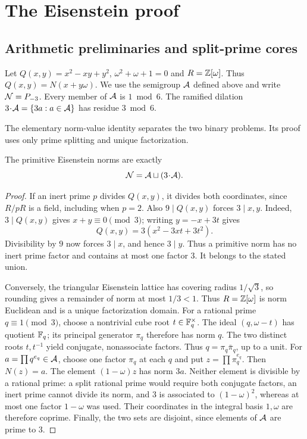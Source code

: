 \section{The Eisenstein proof}\label{sec:eisenstein}
\subsection{Arithmetic preliminaries and split-prime cores}
Let $Q(x,y)=x^2-xy+y^2$, $\omega^2+\omega+1=0$ and
$R=\Z[\omega]$.  Thus $Q(x,y)=N(x+y\omega)$.  We use the
semigroup $\AA$ defined above and write $\NN=P_{-3}$.
Every member of $\AA$ is $1\bmod6$.  The ramified dilation
$3\!\cdot\!\AA=\{3a:a\in\AA\}$ has residue $3\bmod6$.

The elementary norm-value identity separates the two binary problems.
Its proof uses only prime splitting and unique factorization.

\begin{proposition}\label{prop:primitive-classification}
The primitive Eisenstein norms are exactly
\[
\NN=\AA\sqcup(3\!\cdot\!\AA).
\]
\end{proposition}
\begin{proof}
If an inert prime $p$ divides $Q(x,y)$, it divides both coordinates,
since $R/pR$ is a field, including when $p=2$. Also $9\mid Q(x,y)$ forces $3\mid x,y$.
Indeed, $3\mid Q(x,y)$ gives $x+y\equiv0\pmod3$; writing
$y=-x+3t$ gives
\[
Q(x,y)=3(x^2-3xt+3t^2).
\]
Divisibility by $9$ now forces $3\mid x$, and hence $3\mid y$.
Thus a primitive norm has no inert prime factor and contains at most
one factor $3$. It belongs to the stated union.

Conversely, the triangular Eisenstein lattice has covering radius
$1/\sqrt3$, so rounding gives a remainder of norm at most $1/3<1$.
Thus $R=\Z[\omega]$ is norm Euclidean and is a unique factorization
domain. For a rational
prime $q\equiv1\pmod3$, choose a nontrivial cube root
$t\in\F_q^\times$. The ideal $(q,\omega-t)$ has quotient $\F_q$;
its principal generator $\pi_q$ therefore has norm $q$. The two distinct
roots $t,t^{-1}$ yield conjugate, nonassociate factors. Thus
$q=\pi_q\bar\pi_q$, up to a unit.
For $a=\prod q^{e_q}\in\AA$, choose one factor $\pi_q$ at each $q$ and
put $z=\prod\pi_q^{e_q}$. Then $N(z)=a$. The element
$(1-\omega)z$ has norm $3a$. Neither element is divisible by a rational
prime: a split rational prime would require both conjugate factors,
an inert prime cannot divide its norm, and $3$ is associated to
$(1-\omega)^2$, whereas at most one factor $1-\omega$ was used.
Their coordinates in the integral basis $1,\omega$ are therefore
coprime. Finally, the two sets are disjoint, since elements of $\AA$
are prime to $3$.
\end{proof}

